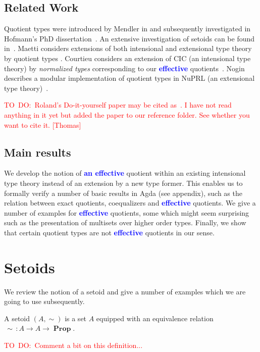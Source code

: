 \documentclass[envcountsame]{llncs}
\newcommand{\todo}[1]{\textcolor{red}{TO~DO:~#1}}
\newcommand{\amend}[2][]{\textcolor{blue}{#2}}
\newcommand{\definable}{\amend[]{\textbf{effective }}}
\newcommand{\adefinable}{\amend[]{\textbf{an effective }}}
\DeclareMathOperator{\Prop}{\mathbf{Prop}}
\begin{document}

\subsection{Related Work}
\label{sec:related-work}

Quotient types were introduced by Mendler in
\cite{mendler1990quotient} and subsequently investigated in Hofmann's
PhD dissertation~\cite{hofmann1995thesis}. An extensive investigation of setoids
can be found in~\cite{barthe2003setoids}. Maetti considers extensions
of both intensional and extensional type theory by quotient types
\cite{maietti1999effective}. Courtieu considers an extension of CIC
(an intensional type theory) by \emph{normalized types} corresponding
to our \definable quotients~\cite{courtieulcs01}. Nogin describes a
modular implementation of quotient types in NuPRL (an extensional type
theory)~\cite{Nogin02quotienttypes}.

\todo{Roland's Do-it-yourself paper may be cited as~\cite{backhouse1989fac}. I have not read anything in it yet but added the paper to our reference folder. See whether you want to cite it. [Thomas] }

\subsection{Main results}
\label{sec:main-results}

We develop the notion of \adefinable quotient within an existing
intensional type theory instead of an extension by a new type former.
This enables us to formally verify a number of basic results in Agda
(see appendix), such as the relation between exact quotients,
coequalizers and \definable quotients. We give a number of examples for
\definable quotients, some which might seem surprising such as the presentation
of multisets over higher order types. Finally, we show that certain
quotient types are not \definable quotients in our sense.

\section{Setoids}\label{sec:setoids}

We review the notion of a setoid and give a number of examples which
we are going to use subsequently.

\begin{definition}
A setoid $(A,\sim)$ is a set $A$ equipped with an equivalence relation ${\,\sim\,}\colon A \to A \to \Prop$.
\end{definition}
\todo{Comment a bit on this definition...}
\end{document}
